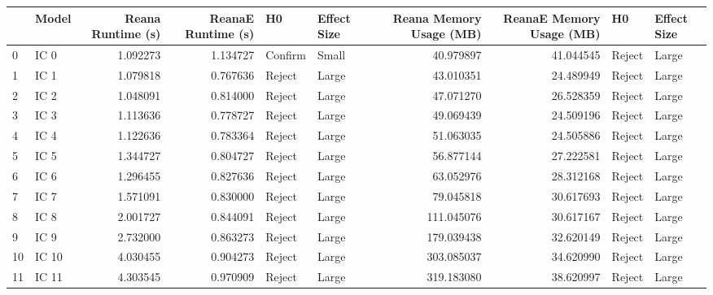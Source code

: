 \begin{tabular}{llrrllrrll}
\toprule
{} &  Model &  Reana Runtime (s) &  ReanaE Runtime (s) &       H0 & Effect Size &  Reana Memory Usage (MB) &  ReanaE Memory Usage (MB) &      H0 & Effect Size \\
\midrule
0  &   IC 0 &           1.092273 &            1.134727 &  Confirm &       Small &                40.979897 &                 41.044545 &  Reject &       Large \\
1  &   IC 1 &           1.079818 &            0.767636 &   Reject &       Large &                43.010351 &                 24.489949 &  Reject &       Large \\
2  &   IC 2 &           1.048091 &            0.814000 &   Reject &       Large &                47.071270 &                 26.528359 &  Reject &       Large \\
3  &   IC 3 &           1.113636 &            0.778727 &   Reject &       Large &                49.069439 &                 24.509196 &  Reject &       Large \\
4  &   IC 4 &           1.122636 &            0.783364 &   Reject &       Large &                51.063035 &                 24.505886 &  Reject &       Large \\
5  &   IC 5 &           1.344727 &            0.804727 &   Reject &       Large &                56.877144 &                 27.222581 &  Reject &       Large \\
6  &   IC 6 &           1.296455 &            0.827636 &   Reject &       Large &                63.052976 &                 28.312168 &  Reject &       Large \\
7  &   IC 7 &           1.571091 &            0.830000 &   Reject &       Large &                79.045818 &                 30.617693 &  Reject &       Large \\
8  &   IC 8 &           2.001727 &            0.844091 &   Reject &       Large &               111.045076 &                 30.617167 &  Reject &       Large \\
9  &   IC 9 &           2.732000 &            0.863273 &   Reject &       Large &               179.039438 &                 32.620149 &  Reject &       Large \\
10 &  IC 10 &           4.030455 &            0.904273 &   Reject &       Large &               303.085037 &                 34.620990 &  Reject &       Large \\
11 &  IC 11 &           4.303545 &            0.970909 &   Reject &       Large &               319.183080 &                 38.620997 &  Reject &       Large \\

\end{tabular}
